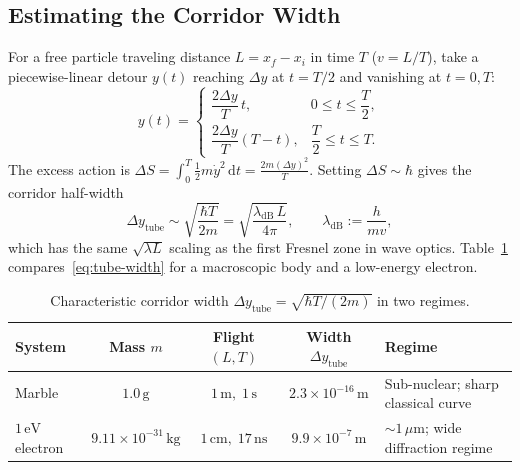 \documentclass[11pt,a4paper]{article}
\newcommand{\dd}{\mathrm{d}}
\begin{document}
\subsection{Estimating the Corridor Width}

For a free particle traveling distance $L = x_f - x_i$ in time $T$ ($v = L/T$), take a piecewise-linear detour $y(t)$ reaching $\Delta y$ at $t = T/2$ and vanishing at $t=0, T$:
\begin{equation}
    y(t) =
    \begin{cases}
        \dfrac{2\Delta y}{T}\,t, & 0 \le t \le \dfrac{T}{2}, \\[6pt]
        \dfrac{2\Delta y}{T}(T-t), & \dfrac{T}{2} \le t \le T.
    \end{cases}
\end{equation}
The excess action is $\Delta S = \int_0^T \frac{1}{2}m\dot y^2\,\dd t = \frac{2m(\Delta y)^2}{T}$. Setting $\Delta S \sim \hbar$ gives the corridor half-width
\begin{equation}
    \Delta y_{\mathrm{tube}} \sim \sqrt{\frac{\hbar T}{2m}}
    = \sqrt{\frac{\lambda_{\mathrm{dB}}\,L}{4\pi}},
    \qquad
    \lambda_{\mathrm{dB}} := \frac{h}{mv},
    \label{eq:tube-width}
\end{equation}
which has the same $\sqrt{\lambda L}$ scaling as the first Fresnel zone in wave optics. Table~\ref{tab:tube-scales} compares~\eqref{eq:tube-width} for a macroscopic body and a low-energy electron.

\begin{table}[!htbp]
    \centering
    \small
    \setlength{\tabcolsep}{6pt}
    \renewcommand{\arraystretch}{1.25}
    \begin{tabular}{@{}l c c c >{\raggedright\arraybackslash}p{4.4cm}@{}}
        \toprule
        \textbf{System} & \textbf{Mass $m$} & \textbf{Flight $(L, T)$} & \textbf{Width $\Delta y_{\mathrm{tube}}$} & \textbf{Regime} \\
        \midrule
        Marble & $1.0\,\text{g}$ & $1\,\text{m},\; 1\,\text{s}$ & $2.3 \times 10^{-16}\,\text{m}$ & Sub-nuclear; sharp classical curve \\
        $1\,\text{eV}$ electron & $9.11 \times 10^{-31}\,\text{kg}$ & $1\,\text{cm},\; 17\,\text{ns}$ & $9.9 \times 10^{-7}\,\text{m}$ & $\sim 1\,\mu\text{m}$; wide diffraction regime \\
        \bottomrule
    \end{tabular}
    \caption{Characteristic corridor width $\Delta y_{\mathrm{tube}} = \sqrt{\hbar T/(2m)}$ in two regimes.}
    \label{tab:tube-scales}
\end{table}
\end{document}
